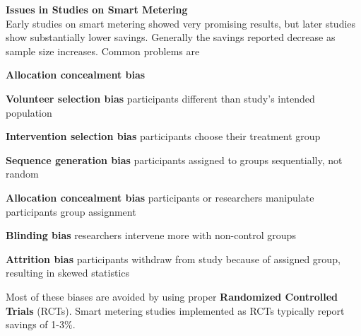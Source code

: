 \begin{tcolorbox}
\textbf{Issues in Studies on Smart Metering}\\
Early studies on smart metering showed very promising results, but later studies show substantially lower savings.
Generally the savings reported decrease as sample size increases.
Common problems are

\begin{labeling}{\textbf{Allocation concealment bias}}
    \item [\textbf{Volunteer selection bias}]
    participants different than study's intended population
    \item [\textbf{Intervention selection bias}]
    participants choose their treatment group
    \item [\textbf{Sequence generation bias}]
    participants assigned to groups sequentially, not random
    \item [\textbf{Allocation concealment bias}]
    participants or researchers manipulate participants group assignment
    \item [\textbf{Blinding bias}]
    researchers intervene more with non-control groups
    \item [\textbf{Attrition bias}]
    participants withdraw from study because of assigned group, resulting in skewed statistics
\end{labeling}

 Most of these biases are avoided by using proper \textbf{Randomized Controlled Trials} (RCTs). Smart metering studies implemented as RCTs typically report savings of 1-3\%.

\end{tcolorbox}

